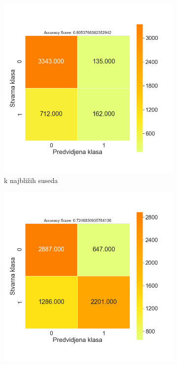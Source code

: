\documentclass[12pt,oneside]{memoir}
\begin{document}
\begin{figure}[!h]
    \centering
    \begin{subfigure}[b]{0.45\textwidth}
        \centering
        \includegraphics[width=\textwidth]{KNN_basic_data_confussion_matrix}
        \caption{k najbližih suseda}
        \label{fig:knear}
    \end{subfigure}
    \begin{subfigure}[b]{0.45\textwidth}
        \centering
        \includegraphics[width=\textwidth]{LR_basic_data_confussion_matrix}

\end{subfigure}
\end{figure}
\end{document}

